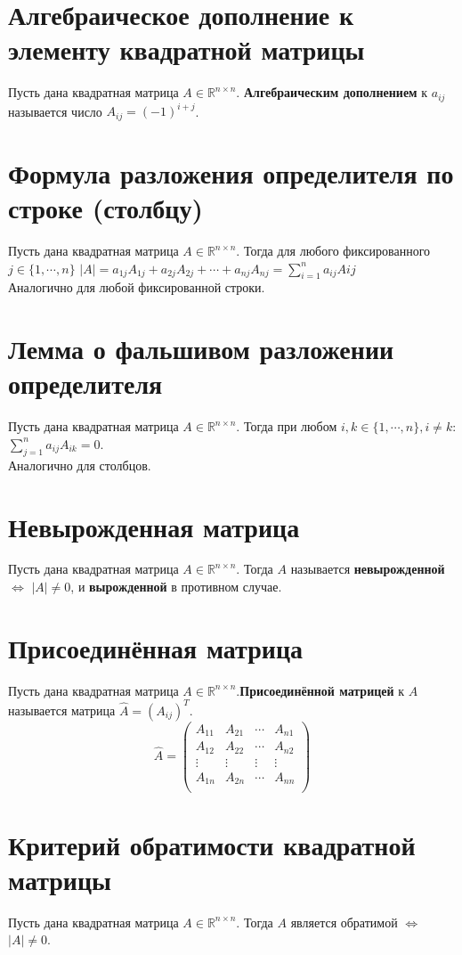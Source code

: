 \documentclass[a4paper,11pt]{report}
\begin{document}
\section{Алгебраическое дополнение к элементу квадратной матрицы}
Пусть дана квадратная матрица $A \in \mathbb{R}^{n\times{n}}$. \textbf{Алгебраическим дополнением} к $a_{ij}$ называется
число $A_{ij} = (-1)^{i + j}$.
\section{Формула разложения определителя по строке (столбцу)}
Пусть дана квадратная матрица $A \in \mathbb{R}^{n\times{n}}$. Тогда для любого фиксированного $j \in \{1, \cdots, n\}$
$|A| = a_{1j}A_{1j} + a_{2j}A_{2j} + \cdots + a_{nj}A_{nj} = \sum\limits_{i = 1}^n{a_{ij}A{ij}}$\\
Аналогично для любой фиксированной строки.
\section{Лемма о фальшивом разложении определителя}
Пусть дана квадратная матрица $A \in \mathbb{R}^{n\times{n}}$. Тогда при любом $i, k \in \{1, \cdots, n\}, i \neq k$:
$\sum\limits_{j = 1}^n{a_{ij}A_{ik}} = 0$.\\
Аналогично для столбцов.
\section{Невырожденная матрица}
Пусть дана квадратная матрица $A \in \mathbb{R}^{n\times{n}}$. Тогда $A$ называется \textbf{невырожденной} $\Leftrightarrow$
$|A| \neq 0$, и \textbf{вырожденной} в противном случае.
\section{Присоединённая матрица}
Пусть дана квадратная матрица $A \in \mathbb{R}^{n\times{n}}$.\textbf{Присоединённой матрицей} к $A$ называется
матрица $\hat{A} = (A_{ij})^T$.
\[
\hat{A} = 
\begin{pmatrix}
A_{11} & A_{21} & \cdots & A_{n1}\\
A_{12} & A_{22} & \cdots & A_{n2}\\
\vdots & \vdots & \vdots & \vdots\\
A_{1n} & A_{2n} & \cdots & A_{nn}\\
\end{pmatrix}
\]
\section{Критерий обратимости квадратной матрицы}
Пусть дана квадратная матрица $A \in \mathbb{R}^{n\times{n}}$. Тогда $A$ является обратимой $\Leftrightarrow$ $|A| \neq 0$.
\end{document}
